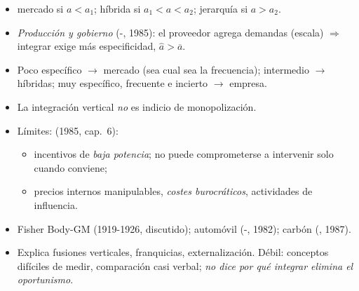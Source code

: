 \documentclass{article}
\begin{document}
\begin{columnas}
\begin{itemize}
  \begin{itemize}
  \item mercado si $a<a_1$; híbrida si $a_1<a<a_2$; jerarquía si $a>a_2$.
  \end{itemize}
\end{itemize}
\begin{itemize}
\item \emph{Producción y gobierno} (-, 1985): el proveedor agrega demandas (escala) $\Rightarrow$ integrar exige más especificidad, $\hat a>\overline{a}$.
\end{itemize}
\begin{itemize}
\item Poco específico $\to$ mercado (sea cual sea la frecuencia); intermedio $\to$ híbridas; muy específico, frecuente e incierto $\to$ empresa.
\item La integración vertical \emph{no} es indicio de monopolización.
\item Límites:  (1985, cap.~6):
  \begin{itemize}
  \item incentivos de \emph{baja potencia}; no puede comprometerse a intervenir solo cuando conviene;
  \item precios internos manipulables, \emph{costes burocráticos}, actividades de influencia.
  \end{itemize}
\end{itemize}
\begin{itemize}
\item Fisher Body-GM (1919-1926, discutido); automóvil (-, 1982); carbón (, 1987).
\item Explica fusiones verticales, franquicias, externalización. Débil: conceptos difíciles de medir, comparación casi verbal; \emph{no dice por qué integrar elimina el oportunismo}.
\end{itemize}


\end{columnas}
\end{document}
